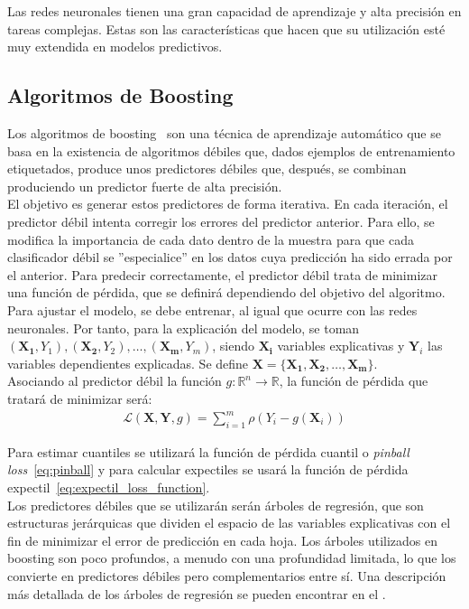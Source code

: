 \documentclass[11pt]{book}
\theoremstyle{plain} %
\theoremstyle{definition} %
\begin{document}
Las redes neuronales tienen una gran capacidad de aprendizaje y alta precisión en 
tareas complejas. Estas son las características que hacen que su utilización esté muy 
extendida en modelos predictivos.\\

\subsection{Algoritmos de Boosting}
Los algoritmos de boosting~\cite{SF12} son una técnica de aprendizaje 
automático que se basa en la existencia de algoritmos débiles que, dados 
ejemplos de entrenamiento etiquetados, produce unos predictores débiles que, 
después, se combinan produciendo un predictor fuerte de alta precisión.\\

El objetivo es generar estos predictores de forma iterativa. En cada iteración, el predictor 
débil intenta corregir los errores del predictor anterior. Para ello, se modifica la importancia 
de cada dato dentro de la muestra para que cada clasificador débil se ''especialice'' en 
los datos cuya predicción ha sido errada por el anterior. Para predecir correctamente, 
el predictor débil trata de minimizar una función de pérdida, que se definirá dependiendo 
del objetivo del algoritmo.\\

Para ajustar el modelo, se debe entrenar, al igual que ocurre con las redes 
neuronales. Por tanto, para la explicación del modelo, se toman 
$(\mathbf{X_1}, Y_1), (\mathbf{X_2}, Y_2), \dots, (\mathbf{X_m}, Y_m)$, 
siendo $\mathbf{X_i}$ 
variables explicativas y $\mathbf{Y}_i$ las variables dependientes explicadas.
Se define $\mathbf{X} = \{\mathbf{X_1}, \mathbf{X_2}, \dots, \mathbf{X_m}\}$.\\

Asociando al predictor débil la función $g: \mathbb{R}^n \to \mathbb{R}$, la función de 
pérdida que tratará de minimizar será:
\begin{align*}
   \mathcal{L}(\mathbf{X}, \mathbf{Y}, g) = \sum_{i=1}^m \rho(Y_i - g(\mathbf{X}_i))
\end{align*}

Para estimar cuantiles se utilizará la función de pérdida 
cuantil o \textit{pinball loss}~\eqref{eq:pinball} y para calcular expectiles se usará la función de pérdida 
expectil~\eqref{eq:expectil_loss_function}.\\

Los predictores débiles que se utilizarán serán árboles de regresión, que son 
estructuras jerárquicas que dividen el espacio de las variables explicativas con el fin 
de minimizar el error de predicción en cada hoja. Los árboles utilizados en boosting son 
poco profundos, a menudo con una profundidad limitada, lo que los convierte en 
predictores débiles pero complementarios entre sí. Una descripción más detallada 
de los árboles de regresión se pueden encontrar en el .\\
\end{document}
